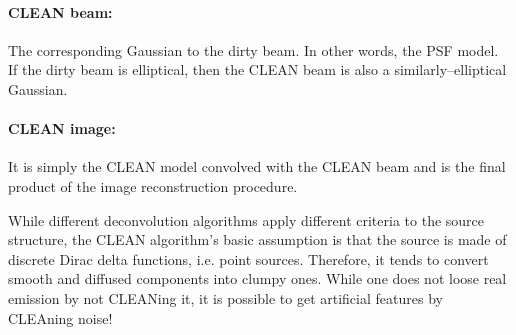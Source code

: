 \documentclass[paper=a4, fontsize=11pt]{scrartcl} %
\numberwithin{equation}{section} %
\numberwithin{figure}{section} %
\numberwithin{table}{section} %
\begin{document}
\paragraph*{CLEAN beam:} The corresponding Gaussian to the dirty beam. In other words, the PSF model. If the dirty beam is elliptical, then the CLEAN beam is also a similarly--elliptical Gaussian.
\paragraph*{CLEAN image:} It is simply the CLEAN model convolved with the CLEAN beam and is the final product of the image reconstruction procedure. 


While different deconvolution algorithms apply different criteria to the source structure, the CLEAN algorithm's basic assumption is that the source is made of discrete Dirac delta functions, i.e. point sources. Therefore, it tends to convert smooth and diffused components into clumpy ones. While one does not loose real emission by not CLEANing it, it is possible to get artificial features by CLEAning noise!


\end{document}
